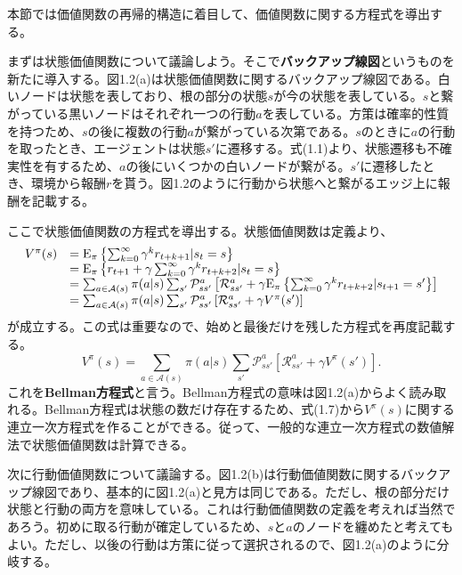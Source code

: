\documentclass[dvipdfmx, 9pt, a4paper]{jsarticle}
\numberwithin{equation}{section}
\begin{document}
本節では価値関数の再帰的構造に着目して、価値関数に関する方程式を導出する。\par
まずは状態価値関数について議論しよう。そこで{\bf バックアップ線図}というものを新たに導入する。図1.2(a)は状態価値関数に関するバックアップ線図である。白いノードは状態を表しており、根の部分の状態$s$が今の状態を表している。$s$と繋がっている黒いノードはそれぞれ一つの行動$a$を表している。方策は確率的性質を持つため、$s$の後に複数の行動$a$が繋がっている次第である。$s$のときに$a$の行動を取ったとき、エージェントは状態$s'$に遷移する。式(1.1)より、状態遷移も不確実性を有するため、$a$の後にいくつかの白いノードが繋がる。$s'$に遷移したとき、環境から報酬$r$を貰う。図1.2のように行動から状態へと繋がるエッジ上に報酬を記載する。\par
ここで状態価値関数の方程式を導出する。状態価値関数は定義より、
\begin{equation}
\begin{array}{ll}
V^\pi(s) & ={\rm E}_\pi\left\{ \sum_{k=0}^\infty \gamma^kr_{t+k+1}|s_t=s \right\} \\
 & ={\rm E}_\pi\left\{ r_{t+1}+\gamma\sum_{k=0}^\infty \gamma^kr_{t+k+2}|s_t=s \right\} \\
 & =\sum_{a \in \mathcal{A}(s)}\pi(a|s)\sum_{s'}\mathcal{P}^a_{ss'}\left[\mathcal{R}^a_{ss'}+\gamma{\rm E}_\pi\left\{ \sum_{k=0}^\infty \gamma^kr_{t+k+2}|s_{t+1}=s' \right\}\right] \\
 & =\sum_{a \in \mathcal{A}(s)}\pi(a|s)\sum_{s'}\mathcal{P}^a_{ss'} \left[\mathcal{R}^a_{ss'}+\gamma V^\pi(s')\right] \notag
\end{array}
\end{equation}
が成立する。この式は重要なので、始めと最後だけを残した方程式を再度記載する。\begin{equation}
V^\pi(s)=\sum_{a \in \mathcal{A}(s)}\pi(a|s)\sum_{s'}\mathcal{P}^a_{ss'} \left[\mathcal{R}^a_{ss'}+\gamma V^\pi(s')\right].
\end{equation}
これを{\bf Bellman方程式}と言う。Bellman方程式の意味は図1.2(a)からよく読み取れる。Bellman方程式は状態の数だけ存在するため、式(1.7)から$V^\pi(s)$に関する連立一次方程式を作ることができる。従って、一般的な連立一次方程式の数値解法で状態価値関数は計算できる。\par
次に行動価値関数について議論する。図1.2(b)は行動価値関数に関するバックアップ線図であり、基本的に図1.2(a)と見方は同じである。ただし、根の部分だけ状態と行動の両方を意味している。これは行動価値関数の定義を考えれば当然であろう。初めに取る行動が確定しているため、$s$と$a$のノードを纏めたと考えてもよい。ただし、以後の行動は方策に従って選択されるので、図1.2(a)のように分岐する。\par
\end{document}
